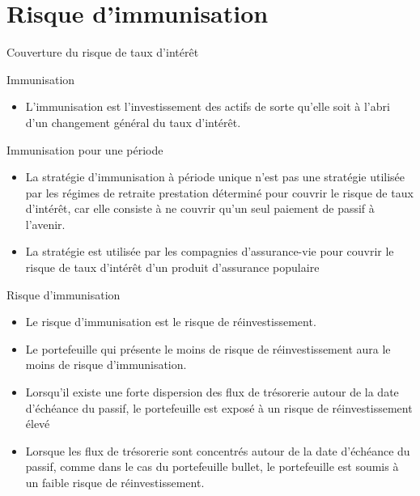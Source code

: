 \documentclass{beamer}
\begin{document}
\section{Risque d'immunisation}
\begin{frame}{Couverture du risque de taux d’intérêt}
\begin{block}{Immunisation}
\begin{itemize}[label=\bullet]
\item L'immunisation est l'investissement des actifs de sorte qu'elle soit à l'abri d'un changement général du taux d'intérêt.
\end{itemize}
\end{block}
\begin{block}{Immunisation pour une période}
\begin{itemize}[label=\bullet]
\item La stratégie d'immunisation à période unique n'est pas une stratégie utilisée par les régimes de retraite prestation déterminé  pour couvrir le risque de taux d'intérêt, car elle consiste à ne couvrir qu'un seul paiement de passif à l'avenir.
\item La stratégie est utilisée par les compagnies d'assurance-vie pour couvrir le risque de taux d'intérêt d'un produit d'assurance populaire
\end{itemize}
\end{block}
\end{frame}
\begin{frame}{Risque d'immunisation}
\begin{itemize}[label=\bullet]
\item Le risque d'immunisation est le risque de réinvestissement.
\item Le portefeuille qui présente le moins de risque de réinvestissement aura le moins de risque d'immunisation.
\item Lorsqu'il existe une forte dispersion des flux de trésorerie autour de la date d'échéance du passif, le portefeuille est exposé à un risque de réinvestissement élevé
\item Lorsque les flux de trésorerie sont concentrés autour de la date d'échéance du passif, comme dans le cas du portefeuille bullet, le portefeuille est soumis à un faible risque de réinvestissement.
\end{itemize}
\end{frame}
\end{document}
